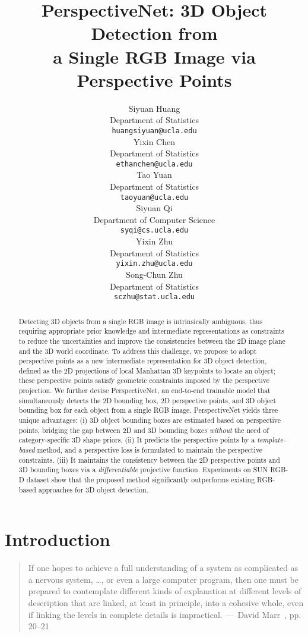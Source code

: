 \documentclass{article}
\title{PerspectiveNet: 3D Object Detection from\\a Single RGB Image via Perspective Points}
\author{Siyuan Huang \\
  Department of Statistics\\
  \texttt{huangsiyuan@ucla.edu}\\
  \And
  Yixin Chen\\
  Department of Statistics\\
  \texttt{ethanchen@ucla.edu}\\
  \And
  Tao Yuan\\
  Department of Statistics\\
  \texttt{taoyuan@ucla.edu}\\
  \AND
  Siyuan Qi\\
  Department of Computer Science\\
  \texttt{syqi@cs.ucla.edu}\\
  \And
  Yixin Zhu\\
  Department of Statistics\\
  \texttt{yixin.zhu@ucla.edu}\\
  \And
  Song-Chun Zhu\\
  Department of Statistics\\
  \texttt{sczhu@stat.ucla.edu}\\
}
\begin{document}
\maketitle


\begin{abstract}
Detecting 3D objects from a single RGB image is intrinsically ambiguous, thus requiring appropriate prior knowledge and intermediate representations as constraints to reduce the uncertainties and improve the consistencies between the 2D image plane and the 3D world coordinate. To address this challenge, we propose to adopt perspective points as a new intermediate representation for 3D object detection, defined as the 2D projections of local Manhattan 3D keypoints to locate an object; these perspective points satisfy geometric constraints imposed by the perspective projection. We further devise PerspectiveNet, an end-to-end trainable model that simultaneously detects the 2D bounding box, 2D perspective points, and 3D object bounding box for each object from a single RGB image. PerspectiveNet yields three unique advantages: (i) 3D object bounding boxes are estimated based on perspective points, bridging the gap between 2D and 3D bounding boxes \emph{without} the need of category-specific 3D shape priors. (ii) It predicts the perspective points by a \emph{template-based} method, and a perspective loss is formulated to maintain the perspective constraints. (iii) It maintains the consistency between the 2D perspective points and 3D bounding boxes via a \emph{differentiable} projective function. Experiments on SUN RGB-D dataset show that the proposed method significantly outperforms existing RGB-based approaches for 3D object detection.
\end{abstract}

\section{Introduction}
\label{sec:intro}

\begin{quote}
    If one hopes to achieve a full understanding of a system as complicated as a nervous system, \ldots, or even a large computer program, then one must be prepared to contemplate different kinds of explanation at different levels of description that are linked, at least in principle, into a cohesive whole, even if linking the levels in complete details is impractical. \hfill---~David Marr~\cite{marr1982vision}, pp. 20--21
\end{quote}
\end{document}
